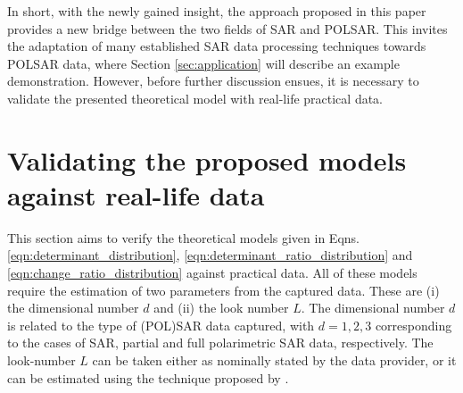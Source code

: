 \documentclass[journal]{IEEEtran}
\begin{document}

In short, with the newly gained insight,
  the approach proposed in this paper provides a new bridge between the two fields of SAR and POLSAR.
This invites the adaptation of many established SAR data processing techniques towards POLSAR data,
  where Section \ref{sec:application} will describe an example demonstration.
However, before further discussion ensues, 
  it is necessary to validate the presented theoretical model with real-life practical data.

\section{Validating the proposed models against real-life data}
\label{sec:polsar_models_validation}

This section aims to verify the theoretical models given in Eqns. \ref{eqn:determinant_distribution}, \ref{eqn:determinant_ratio_distribution} and \ref{eqn:change_ratio_distribution} against practical data.
All of these models require the estimation of two parameters from the captured data.
These are (i) the dimensional number $d$ and (ii) the look number $L$.
The dimensional number $d$ is related to the type of (POL)SAR data captured,
  with $d=1,2,3$ corresponding to the cases of SAR, partial and full polarimetric SAR data, respectively.
The look-number $L$ can be taken either as nominally stated by the data provider,
  or it can be estimated using the technique proposed by \cite{Anfinsen_2009_TGRS_3795}.
\end{document}
